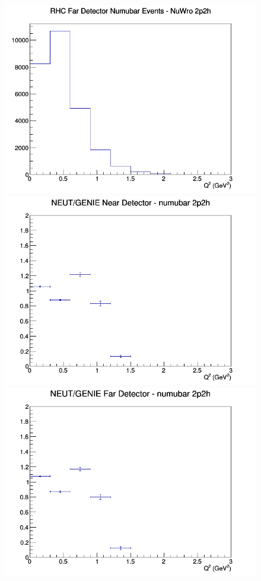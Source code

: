 \begin{figure}[h]
\endminipage
{}
\includegraphics[width=\linewidth]{Q2/nominal/2p2h_RHC_FD_numubar_Q2_NuWro.png}
\endminipage
\newline
{}
\includegraphics[width=\linewidth]{Q2/nominal/ratios/2p2h_NEUT_GENIE_numubar_near_Q2.png}
\endminipage
{}
\includegraphics[width=\linewidth]{Q2/nominal/ratios/2p2h_NEUT_GENIE_numubar_far_Q2.png}

\end{figure}
